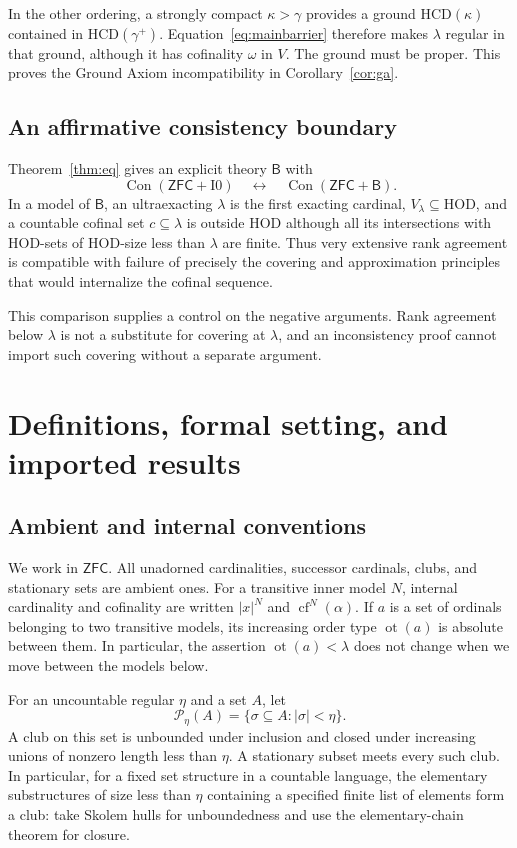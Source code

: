 \documentclass[11pt,letterpaper]{article}
\theoremstyle{definition}
\newcommand{\ZFC}{\mathsf{ZFC}}
\newcommand{\HOD}{\mathrm{HOD}}
\newcommand{\Con}{\operatorname{Con}}
\newcommand{\cf}{\operatorname{cf}}
\newcommand{\ot}{\operatorname{ot}}
\newcommand{\Izero}{\mathrm{I0}}
\newcommand{\HCD}{\mathrm{HCD}}
\newcommand{\Pow}{\mathcal P}
\newcommand{\Bdry}{\mathsf{B}}
\begin{document}
In the other ordering, a strongly compact $\kappa>\gamma$ provides a ground
$\HCD(\kappa)$ contained in $\HCD(\gamma^+)$. Equation~\eqref{eq:mainbarrier}
therefore makes $\lambda$ regular in that ground, although it has cofinality
$\omega$ in $V$. The ground must be proper. This proves the Ground Axiom
incompatibility in Corollary~\ref{cor:ga}.

\subsection{An affirmative consistency boundary}

Theorem~\ref{thm:eq} gives an explicit theory $\Bdry$ with
\[
 \Con(\ZFC+\Izero)\quad\longleftrightarrow\quad\Con(\ZFC+\Bdry).
\]
In a model of $\Bdry$, an ultraexacting $\lambda$ is the first exacting cardinal,
$V_\lambda\subseteq\HOD$, and a countable cofinal set $c\subseteq\lambda$ is
outside HOD although all its intersections with HOD-sets of HOD-size less than
$\lambda$ are finite. Thus very extensive rank agreement is compatible with
failure of precisely the covering and approximation principles that would
internalize the cofinal sequence.

This comparison supplies a control on the negative arguments. Rank agreement
below $\lambda$ is not a substitute for covering at $\lambda$, and an
inconsistency proof cannot import such covering without a separate argument.

\section{Definitions, formal setting, and imported results}\label{sec:setup}

\subsection{Ambient and internal conventions}

We work in $\ZFC$. All unadorned cardinalities, successor cardinals, clubs, and
stationary sets are ambient ones. For a transitive inner model $N$, internal
cardinality and cofinality are written $|x|^N$ and $\cf^N(\alpha)$.
If $a$ is a set of ordinals belonging to two transitive models, its increasing
order type $\ot(a)$ is absolute between them. In particular, the assertion
$\ot(a)<\lambda$ does not change when we move between the models below.

For an uncountable regular $\eta$ and a set $A$, let
\[
 \Pow_\eta(A)=\{\sigma\subseteq A:|\sigma|<\eta\}.
\]
A club on this set is unbounded under inclusion and closed under increasing
unions of nonzero length less than $\eta$. A stationary subset meets every
such club. In particular, for a fixed set structure in a countable language,
the elementary substructures of size less than $\eta$ containing a specified
finite list of elements form a club: take Skolem hulls for unboundedness and
use the elementary-chain theorem for closure.
\end{document}
